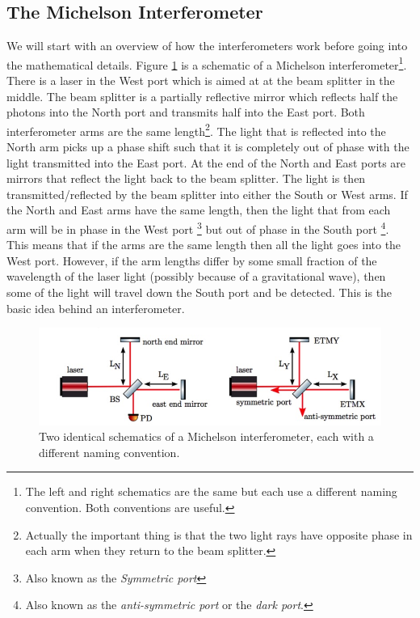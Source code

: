 \documentclass[11pt]{cuthesis}
\begin{document}
\subsection{The Michelson Interferometer} \label{sec:mich}
We will start with an overview of how the interferometers work before going into the mathematical details. Figure \ref{fig:ifo} is a schematic of a Michelson interferometer\footnote{The left and right schematics are the same but each use a different naming convention. Both conventions are useful.}. There is a laser in the West port which is aimed at at the beam splitter in the middle. The beam splitter is a partially reflective mirror which reflects half the photons into the North port and transmits half into the East port. Both interferometer arms are the same length\footnote{Actually the important thing is that the two light rays have opposite phase in each arm when they return to the beam splitter.}. The light that is reflected into the North arm picks up a phase shift such that it is completely out of phase with the light transmitted into the East port. At the end of the North and East ports are mirrors that reflect the light back to the beam splitter. The light is then transmitted/reflected by the beam splitter into either the South or West arms. If the North and East arms have the same length, then the light that from each arm will be in phase in the West port \footnote{Also known as the \emph{Symmetric port}} but out of phase in the South port \footnote{Also known as the \emph{anti-symmetric port} or the \emph{dark port}.}. This means that if the arms are the same length then all the light goes into the West port. However, if the arm lengths differ by some small fraction of the wavelength of the laser light (possibly because of a gravitational wave), then some of the light will travel down the South port and be detected. This is the basic idea behind an interferometer.

\begin{figure}[ht]
\centering
\includegraphics[width=12cm]{michelson.jpg} 
\caption{Two identical schematics of a Michelson interferometer, each with a different naming convention. \cite{ifo_tech} }
\label{fig:ifo}
\end{figure} 
\end{document}
